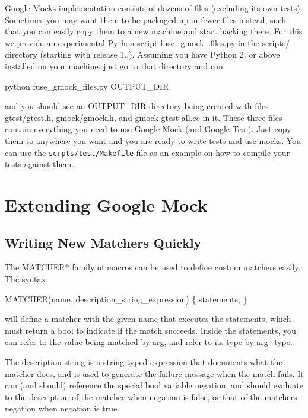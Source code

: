 Google Mock\textquotesingle{}s implementation consists of dozens of files (excluding its own tests). Sometimes you may want them to be packaged up in fewer files instead, such that you can easily copy them to a new machine and start hacking there. For this we provide an experimental Python script {\ttfamily \hyperlink{fuse__gmock__files_8py}{fuse\+\_\+gmock\+\_\+files.\+py}} in the {\ttfamily scripts/} directory (starting with release 1..). Assuming you have Python 2. or above installed on your machine, just go to that directory and run 
\begin{DoxyCode}
python fuse\_gmock\_files.py OUTPUT\_DIR
\end{DoxyCode}


and you should see an {\ttfamily O\+U\+T\+P\+U\+T\+\_\+\+D\+IR} directory being created with files {\ttfamily \hyperlink{gtest_8h}{gtest/gtest.\+h}}, {\ttfamily \hyperlink{gmock_8h}{gmock/gmock.\+h}}, and {\ttfamily gmock-\/gtest-\/all.\+cc} in it. These three files contain everything you need to use Google Mock (and Google Test). Just copy them to anywhere you want and you are ready to write tests and use mocks. You can use the \href{http://code.google.com/p/googlemock/source/browse/trunk/scripts/test/Makefile}{\tt scrpts/test/\+Makefile} file as an example on how to compile your tests against them.

\section*{Extending Google Mock}

\subsection*{Writing New Matchers Quickly}

The {\ttfamily M\+A\+T\+C\+H\+E\+R$\ast$} family of macros can be used to define custom matchers easily. The syntax\+:


\begin{DoxyCode}
MATCHER(name, description\_string\_expression) \{ statements; \}
\end{DoxyCode}


will define a matcher with the given name that executes the statements, which must return a {\ttfamily bool} to indicate if the match succeeds. Inside the statements, you can refer to the value being matched by {\ttfamily arg}, and refer to its type by {\ttfamily arg\+\_\+type}.

The description string is a {\ttfamily string}-\/typed expression that documents what the matcher does, and is used to generate the failure message when the match fails. It can (and should) reference the special {\ttfamily bool} variable {\ttfamily negation}, and should evaluate to the description of the matcher when {\ttfamily negation} is {\ttfamily false}, or that of the matcher\textquotesingle{}s negation when {\ttfamily negation} is {\ttfamily true}.

